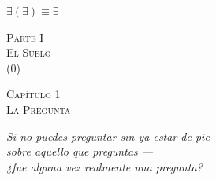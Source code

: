 \documentclass[10pt, openany, oneside]{book}
\renewcommand{\normalsize}{\fontsize{10}{13}\selectfont}
\renewcommand{\large}{\fontsize{11.5}{14}\selectfont}
\renewcommand{\LARGE}{\fontsize{15}{18}\selectfont}
\renewcommand{\huge}{\fontsize{17}{21}\selectfont}
\begin{document}
\vspace{0.5em}

\begin{center}
    $\exists(\exists) \equiv \exists$
\end{center}

%
%
%
%

%
%

\newpage
\thispagestyle{empty}
\vspace*{\fill}
\begin{center}
    {\LARGE\scshape Parte I}\\[1em]
    {\large\scshape El Suelo}\\[0.5em]
    {\normalsize (0)}
\end{center}
\vspace*{\fill}
\newpage


\newpage

\begin{center}
    {\huge\scshape Capítulo 1}\\[0.3em]
    {\large\scshape La Pregunta}
\end{center}

\vspace{1.5em}

\begin{center}
    \itshape
    Si no puedes preguntar sin ya estar de pie\\
    sobre aquello que preguntas ---\\
    ¿fue alguna vez realmente una pregunta?
\end{center}

\vspace{2em}

\end{document}
